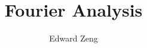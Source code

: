 
\title{Fourier Analysis}
\author{Edward Zeng}


    \maketitle
    \tableofcontents
    \newpage
    \pagestyle{fancy}
    
    
    
    
    
    
    
    
    
    


